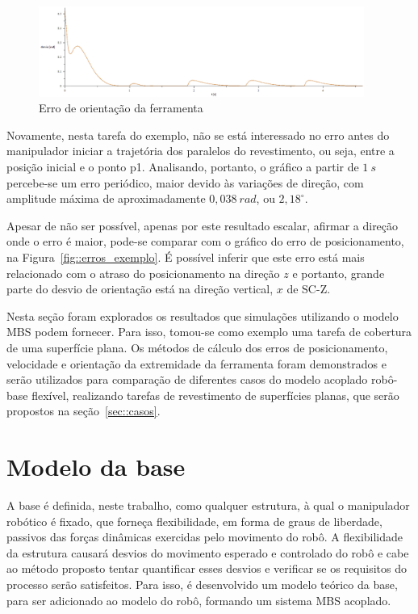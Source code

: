 \begin{figure}[h]
	\centering 
 	\includegraphics[width=0.95\textwidth]{figs/orierro_exemplo}
 	\caption{Erro de orientação da ferramenta}
 	\label{fig::orierro_exemplo}
\end{figure}

Novamente, nesta tarefa do exemplo, não se está interessado no erro antes do
manipulador iniciar a trajetória dos paralelos do revestimento, ou seja, entre a
posição inicial e o ponto p1.
Analisando, portanto, o gráfico a partir de $1~s$ percebe-se um erro periódico,
maior devido às variações de direção, com amplitude máxima de aproximadamente
$0,038~rad$, ou $2,18^{\circ}$.

Apesar de não ser possível, apenas por este resultado escalar, afirmar a direção
onde o erro é maior, pode-se comparar com o gráfico do erro de posicionamento,
na Figura~\ref{fig::erros_exemplo}. É possível inferir que este erro está mais
relacionado com o atraso do posicionamento na direção $z$ e portanto, grande
parte do desvio de orientação está na direção vertical, $x$ de SC-Z.

Nesta seção foram explorados os resultados que simulações utilizando o modelo
MBS podem fornecer. Para isso, tomou-se como exemplo uma tarefa de cobertura de
uma superfície plana. Os métodos de cálculo dos erros de posicionamento,
velocidade e orientação da extremidade da ferramenta foram demonstrados e serão
utilizados para comparação de diferentes casos do modelo acoplado robô-base
flexível, realizando tarefas de revestimento de superfícies planas, que serão
propostos na seção~\ref{sec::casos}.






\section{Modelo da base} \label{sec::base}

A base é definida, neste trabalho, como qualquer estrutura, à qual o manipulador
robótico é fixado, que forneça flexibilidade, em forma de graus de liberdade,
passivos das forças dinâmicas exercidas pelo movimento do robô. A flexibilidade
da estrutura causará desvios do movimento esperado e controlado do robô e cabe
ao método proposto tentar quantificar esses desvios e verificar se os requisitos
do processo serão satisfeitos. Para isso, é desenvolvido um modelo teórico da
base, para ser adicionado ao modelo do robô, formando um sistema MBS acoplado.

